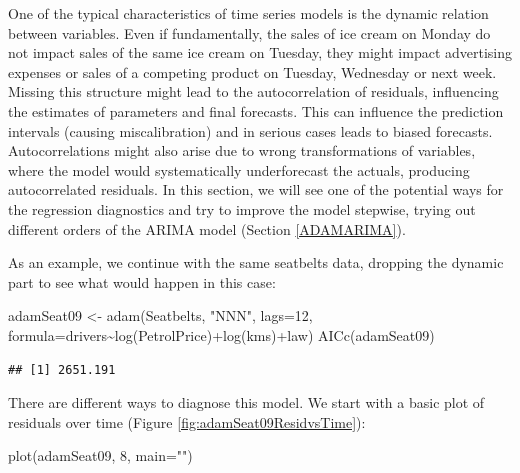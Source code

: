 \documentclass[
]{book}
\newenvironment{Shaded}{\begin{snugshade}}{\end{snugshade}}
\newcommand{\AttributeTok}[1]{\textcolor[rgb]{0.77,0.63,0.00}{#1}}
\newcommand{\DecValTok}[1]{\textcolor[rgb]{0.00,0.00,0.81}{#1}}
\newcommand{\FunctionTok}[1]{\textcolor[rgb]{0.00,0.00,0.00}{#1}}
\newcommand{\NormalTok}[1]{#1}
\newcommand{\OtherTok}[1]{\textcolor[rgb]{0.56,0.35,0.01}{#1}}
\newcommand{\SpecialCharTok}[1]{\textcolor[rgb]{0.00,0.00,0.00}{#1}}
\newcommand{\StringTok}[1]{\textcolor[rgb]{0.31,0.60,0.02}{#1}}
\theoremstyle{definition}
\theoremstyle{definition}
\theoremstyle{definition}
\theoremstyle{definition}
\theoremstyle{remark}
\begin{document}
One of the typical characteristics of time series models is the dynamic relation between variables. Even if fundamentally, the sales of ice cream on Monday do not impact sales of the same ice cream on Tuesday, they might impact advertising expenses or sales of a competing product on Tuesday, Wednesday or next week. Missing this structure might lead to the autocorrelation of residuals, influencing the estimates of parameters and final forecasts. This can influence the prediction intervals (causing miscalibration) and in serious cases leads to biased forecasts. Autocorrelations might also arise due to wrong transformations of variables, where the model would systematically underforecast the actuals, producing autocorrelated residuals. In this section, we will see one of the potential ways for the regression diagnostics and try to improve the model stepwise, trying out different orders of the ARIMA model (Section \ref{ADAMARIMA}).

As an example, we continue with the same seatbelts data, dropping the dynamic part to see what would happen in this case:

\begin{Shaded}
\begin{Highlighting}[]
\NormalTok{adamSeat09 }\OtherTok{\textless{}{-}} \FunctionTok{adam}\NormalTok{(Seatbelts, }\StringTok{"NNN"}\NormalTok{, }\AttributeTok{lags=}\DecValTok{12}\NormalTok{,}
                   \AttributeTok{formula=}\NormalTok{drivers}\SpecialCharTok{\textasciitilde{}}\FunctionTok{log}\NormalTok{(PetrolPrice)}\SpecialCharTok{+}\FunctionTok{log}\NormalTok{(kms)}\SpecialCharTok{+}\NormalTok{law)}
\FunctionTok{AICc}\NormalTok{(adamSeat09)}
\end{Highlighting}
\end{Shaded}

\begin{verbatim}
## [1] 2651.191
\end{verbatim}

There are different ways to diagnose this model. We start with a basic plot of residuals over time (Figure \ref{fig:adamSeat09ResidvsTime}):

\begin{Shaded}
\begin{Highlighting}[]
\FunctionTok{plot}\NormalTok{(adamSeat09, }\DecValTok{8}\NormalTok{, }\AttributeTok{main=}\StringTok{""}\NormalTok{)}
\end{Highlighting}
\end{Shaded}
\end{document}
